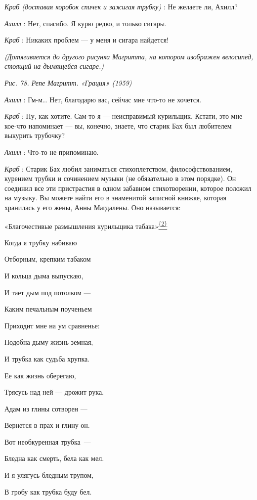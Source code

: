 \documentclass[../main.tex]{subfiles}
\begin{document}
\begin{dialogue}
\emph{Краб (доставая коробок спичек и зажигая трубку)} : Не желаете ли, Ахилл?

\emph{Ахилл} : Нет, спасибо. Я курю редко, и только сигары.

\emph{Краб} : Никаких проблем --- у меня и сигара найдется!

\emph{(Дотягивается до другого рисунка Магритта, на котором изображен велосипед, стоящий на дымящейся сигаре.)}

\emph{Рис. 78. Репе Магритт. «Грация» (1959)}

\emph{Ахилл} : Гм-м\ldots{} Нет, благодарю вас, сейчас мне что-то не хочется.

\emph{Краб} : Ну, как хотите. Сам-то я --- неисправимый курильщик. Кстати, это мне кое-что напоминает --- вы, конечно, знаете, что старик Бах был любителем выкурить трубочку?

\emph{Ахилл} : Что-то не припоминаю.

\emph{Краб} : Старик Бах любил заниматься стихоплетством, философствованием, курением трубки и сочинением музыки (не обязательно в этом порядке). Он соединил все эти пристрастия в одном забавном стихотворении, которое положил на музыку. Вы можете найти его в знаменитой записной книжке, которая хранилась у его жены, Анны Магдалены. Оно называется:

«Благочестивые размышления курильщика табака»\protect\hyperlink{c_2}{\textsuperscript{\uline{\{2\}}}}

Когда я трубку набиваю

Отборным, крепким табаком

И кольца дыма выпускаю,

И тает дым под потолком ---

Каким печальным поученьем

Приходит мне на ум сравненье:

Подобна дыму жизнь земная,

И трубка как судьба хрупка.

Ее как жизнь оберегаю,

Трясусь над ней --- дрожит рука.

Адам из глины сотворен ---

Вернется в прах и глину он.

Вот необкуренная трубка~---

Бледна как смерть, бела как мел.

И я улягусь бледным трупом,

В гробу как трубка буду бел.


\end{dialogue}
\end{document}
